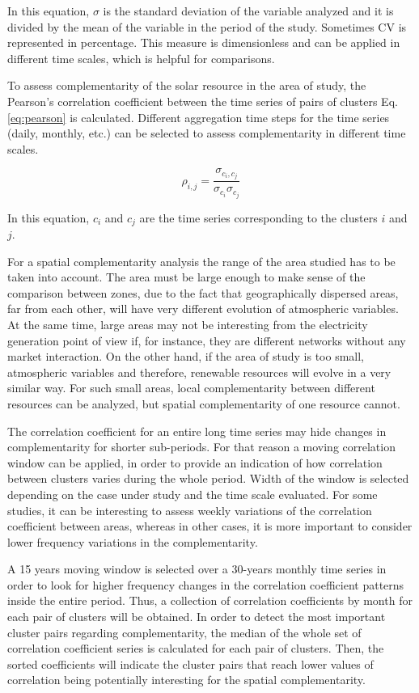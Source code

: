 In this equation, $\sigma$ is the standard deviation of the variable analyzed and it is divided by the mean of the variable in the period of the study. Sometimes CV is represented in percentage. This measure is dimensionless and can be applied in different time scales, which is helpful for comparisons.

To assess complementarity of the solar resource in the area of study, the Pearson's correlation coefficient between the time series of pairs of clusters Eq.\ref{eq:pearson} is calculated. Different aggregation time steps for the time series (daily, monthly, etc.) can be selected to assess complementarity in different time scales. 

\begin{equation}\label{eq:pearson}
  \rho_{i,j}=\frac{\sigma_{c_i,c_j}}{\sigma_{c_i}\sigma_{c_j}}
\end{equation}

In this equation, $c_i$ and $c_j$ are the time series corresponding to the clusters $i$ and $j$.

For a spatial complementarity analysis the range of the area studied has to be taken into account. The area must be large enough to make sense of the comparison between zones, due to the fact that geographically dispersed areas, far from each other, will have very different evolution of atmospheric variables. At the same time, large areas may not be interesting from the electricity generation point of view if, for instance, they are different networks without any market interaction. On the other hand, if the area of study is too small, atmospheric variables and therefore, renewable resources will evolve in a very similar way. For such small areas, local complementarity between different resources can be analyzed, but spatial complementarity of one resource cannot.

The correlation coefficient for an entire long time series may hide changes in complementarity for shorter sub-periods. For that reason a moving correlation window can be applied, in order to provide an indication of how correlation between clusters varies during the whole period. Width of the window is selected depending on the case under study and the time scale evaluated. For some studies, it can be interesting to assess weekly variations of the correlation coefficient between areas, whereas in other cases, it is more important to consider lower frequency variations in the complementarity.

A 15 years moving window is selected over a 30-years monthly time series in order to look for higher frequency changes in the correlation coefficient patterns inside the entire period. Thus, a collection of correlation coefficients by month for each pair of clusters will be obtained. In order to detect the most important cluster pairs regarding complementarity, the median of the whole set of correlation coefficient series is calculated for each pair of clusters. Then, the  sorted coefficients will indicate the cluster pairs that reach lower values of correlation being potentially interesting for the spatial complementarity.

